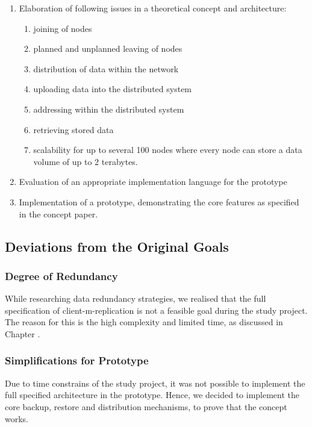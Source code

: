 \begin{enumerate}
    \item Elaboration of following issues in a theoretical concept and architecture:
        \begin{enumerate}
            \item joining of nodes
            \item planned and unplanned leaving of nodes
            \item distribution of data within the network
            \item uploading data into the distributed system
            \item addressing within the distributed system
            \item retrieving stored data
            \item scalability for up to several 100 nodes where every node can store a data volume of up to 2 terabytes.
        \end{enumerate}
    \item Evaluation of an appropriate implementation language for the prototype
    \item Implementation of a prototype, demonstrating the core features as specified in the concept paper.
\end{enumerate}

\subsection{Deviations from the Original Goals}\label{sec:deviations-from-original-goals}

\subsubsection{Degree of Redundancy}
While researching data redundancy strategies, we realised that the full specification of \gls{client-m-replication} is not a feasible goal during the study project. The reason for this is the high complexity and limited time, as discussed in Chapter .

\subsubsection{Simplifications for Prototype}
Due to time constrains of the study project, it was not possible to implement the full specified architecture in the prototype. Hence, we decided to implement the core backup, restore and distribution mechanisms, to prove that the concept works.

